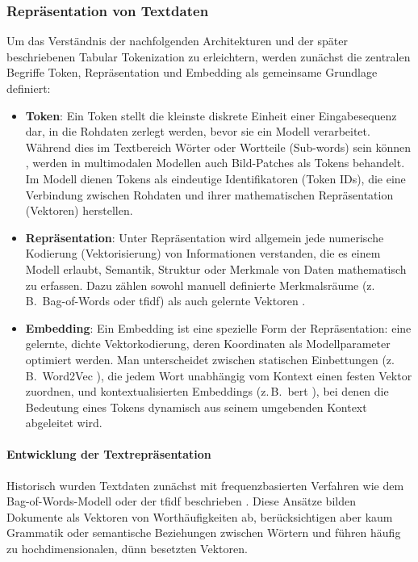 \subsubsection{Repräsentation von Textdaten}
\label{sec:text_representation}
%
Um das Verständnis der nachfolgenden Architekturen und der später beschriebenen Tabular Tokenization zu erleichtern, werden zunächst die zentralen Begriffe Token, Repräsentation und Embedding als gemeinsame Grundlage definiert:

\begin{itemize}
    \item \textbf{Token}: Ein Token stellt die kleinste diskrete Einheit einer Eingabesequenz dar, in die Rohdaten zerlegt werden, bevor sie ein Modell verarbeitet. Während dies im Textbereich Wörter oder Wortteile (Sub-words) sein können \cite{Devlin2019}, werden in multimodalen Modellen auch Bild-Patches \cite{Dosovitskiy2021} als Tokens behandelt. Im Modell dienen Tokens als eindeutige Identifikatoren (Token IDs), die eine Verbindung zwischen Rohdaten und ihrer mathematischen Repräsentation (Vektoren) herstellen.
    \item \textbf{Repräsentation}: Unter Repräsentation wird allgemein jede numerische Kodierung (Vektorisierung) von Informationen verstanden, die es einem Modell erlaubt, Semantik, Struktur oder Merkmale von Daten mathematisch zu erfassen. Dazu zählen sowohl manuell definierte Merkmalsräume (z.\,B.\ Bag-of-Words oder \Gls{tfidf}) als auch gelernte Vektoren \cite{Abubakar2022}.
    \item \textbf{Embedding}: Ein Embedding ist eine spezielle Form der Repräsentation: eine gelernte, dichte Vektorkodierung, deren Koordinaten als Modellparameter optimiert werden. Man unterscheidet zwischen statischen Einbettungen (z.\,B.\ Word2Vec \cite{Mikolov2013}), die jedem Wort unabhängig vom Kontext einen festen Vektor zuordnen, und kontextualisierten Embeddings (z.\,B.\ \gls{bert} \cite{Devlin2019}), bei denen die Bedeutung eines Tokens dynamisch aus seinem umgebenden Kontext abgeleitet wird.
\end{itemize}

\paragraph{Entwicklung der Textrepräsentation}
Historisch wurden Textdaten zunächst mit frequenzbasierten Verfahren wie dem Bag-of-Words-Modell oder der \Gls{tfidf} beschrieben \cite{Salton1988}. Diese Ansätze bilden Dokumente als Vektoren von Worthäufigkeiten ab, berücksichtigen aber kaum Grammatik oder semantische Beziehungen zwischen Wörtern und führen häufig zu hochdimensionalen, dünn besetzten Vektoren.

